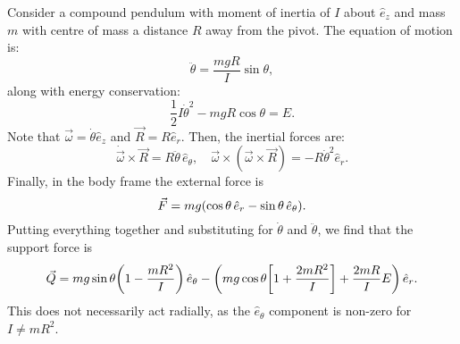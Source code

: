 \documentclass{article}
\begin{document}
\begin{example}
	Consider a compound pendulum with moment of inertia of $ I $ about $ \hat{e}_{z} $ and mass $m$ with centre of mass a distance $R$ away from the pivot. The equation of motion is:
	\[
		\ddot{\theta} = \frac{mgR}{I} \sin \theta,
	\]
	along with energy conservation:
	\[
		\frac{1}{2} I \dot{\theta}^{2} - mg R \cos \theta = E.
	\]
	Note that $ \vec{\omega} = \dot{\theta} \hat{e}_{z} $ and $ \vec{R} = R \hat{e}_{r} $. Then, the inertial forces are:
	\[
	\dot{\vec{\omega}} \times \vec{R} = R \ddot{\theta}  \, \hat{e}_{\theta}, \quad
	\vec{\omega} \times (\vec{\omega} \times \vec{R}) = - R \dot{\theta}^{2} \hat{e}_{r}.
	\]
	Finally, in the body frame the external force is
	\[
		\vec{F} = mg \qty( \cos \theta \, \hat{e}_{r} - \sin \theta \, \hat{e}_{\theta} ).
	\]
	Putting everything together and substituting for $ \dot{\theta} $ and $ \ddot{\theta} $, we find that the support force is
	\[
		\vec{Q} = mg \sin \theta \qty(1 - \frac{mR^2}{I}) \, \hat{e}_{\theta} - \qty(mg\cos\theta \qty[1 + \frac{2mR^2}{I}] + \frac{2mR}{I} E) \, \hat{e}_{r}.
	\]
	This does not necessarily act radially, as the $ \hat{e}_{\theta} $ component is non-zero for $ I \neq mR^{2} $.
\end{example}
\end{document}
